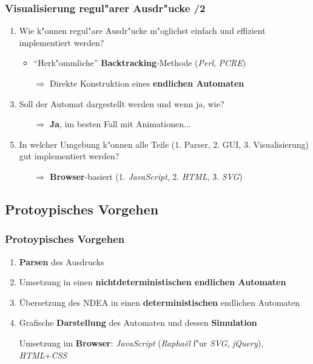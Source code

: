 \documentclass[ignorenonframetext]{beamer}
\begin{document}
\begin{frame}
    \frametitle{Visualisierung regul"arer Ausdr"ucke /2}

	\begin{enumerate}
		\item Wie k"onnen regul"are Ausdr"ucke m"oglichst einfach und effizient implementiert werden?
		\begin{itemize}
			\item ``Herk"ommliche'' \textbf{Backtracking}-Methode (\textit{Perl}, \textit{PCRE})
			\item[$\Rightarrow$] Direkte Konstruktion eines \textbf{endlichen Automaten}
		\end{itemize}
        \item[]
        \item Soll der Automat dargestellt werden und wenn ja, wie?
        \begin{itemize}
            \item[$\Rightarrow$] \textbf{Ja}, im besten Fall mit Animationen...
        \end{itemize}
        \item[]
        \item In welcher Umgebung k"onnen alle Teile (1. Parser, 2. GUI, 3. Visualisierung) gut implementiert werden?
        \begin{itemize}
            \item[$\Rightarrow$] \textbf{Browser}-basiert (1. \textit{JavaScript}, 2. \textit{HTML}, 3. \textit{SVG})
        \end{itemize}
	\end{enumerate}
\end{frame}


\subsection{Protoypisches Vorgehen}
\begin{frame}
    \frametitle{Protoypisches Vorgehen}
	
	\begin{enumerate}
		\item \textbf{Parsen} des Ausdrucks
		\item Umsetzung in einen \textbf{nichtdeterministischen endlichen Automaten}
		\item Übersetzung des NDEA in einen \textbf{deterministischen} endlichen Automaten
		\item Grafische \textbf{Darstellung} des Automaten und dessen \textbf{Simulation}
		\item[]
		\item[] Umsetzung im \textbf{Browser}: \textit{JavaScript} (\textit{Rapha\"el} f"ur \textit{SVG}, \textit{jQuery}), \textit{HTML}+\textit{CSS}
	\end{enumerate}
\end{frame}
\end{document}

